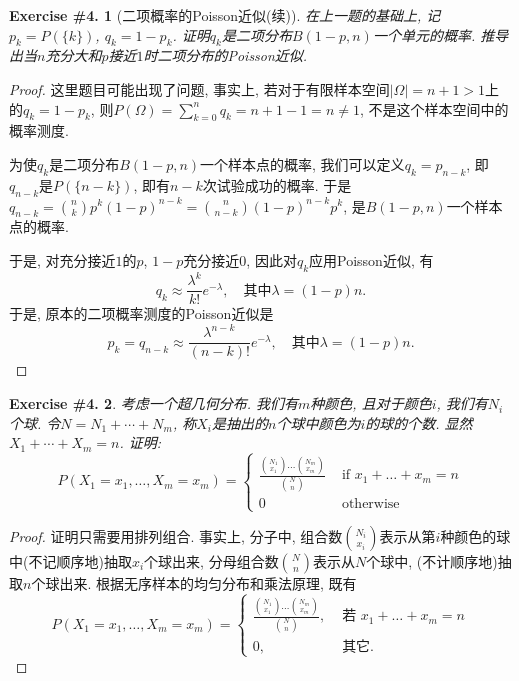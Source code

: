 \documentclass[UTF8, a4paper]{article}
\newtheorem{exercise}{Exercise \#4.}
\begin{document}
\begin{framed}
\begin{exercise}[二项概率的Poisson近似(续)]
    在上一题的基础上, 记\(p_k = P(\{k\})\), \(q_k = 1-p_k\). 证明\(q_k\)是二项分布\(B(1-p, n)\)一个单元的概率.
    推导出当\(n\)充分大和\(p\)接近\(1\)时二项分布的Poisson近似.
\end{exercise}
\end{framed}

\begin{proof}
这里题目可能出现了问题, 事实上, 若对于有限样本空间\(|\Omega| = n + 1> 1\)上的\(q_k = 1 - p_k\), 则\(P(\Omega) = \sum_{k=0}^{n}q_k = n+1-1 = n \neq 1\), 不是这个样本空间中的概率测度.

为使\(q_k\)是二项分布\(B(1-p, n)\)一个样本点的概率, 我们可以定义\(q_k =p_{n-k}\), 即\(q_{n - k}\)是\(P(\{n-k\})\), 即有\(n-k\)次试验成功的概率. 于是\(q_{n - k} = \binom{n}{k}p^k(1-p)^{n-k} = \binom{n}{n-k}(1-p)^{n-k}p^{k}\), 是\(B(1-p, n)\)一个样本点的概率.

于是, 对充分接近\(1\)的\(p\), \(1-p\)充分接近\(0\), 因此对\(q_k\)应用Poisson近似, 有
$$
q_k \approx \frac{\lambda^k}{k!}e^{-\lambda}, \quad \text{其中} \lambda = (1-p)n.
$$
于是, 原本的二项概率测度的Poisson近似是
$$
p_k = q_{n-k} \approx \frac{\lambda^{n-k}}{(n-k)!}e^{-\lambda}, \quad \text{其中} \lambda = (1-p)n.
$$


\end{proof}

\begin{framed}
\begin{exercise}
    考虑一个超几何分布. 我们有\(m\)种颜色, 且对于颜色\(i\), 我们有\(N_i\)个球.
    令\(N = N_1 +\cdots + N_m\), 称\(X_i\)是抽出的\(n\)个球中颜色为\(i\)的球的个数. 显然\(X_1 + \cdots + X_m = n\). 证明:
$$
P\left(X_1=x_1, \ldots, X_m=x_m\right)= \begin{cases}\frac{\binom{N_1}{x_1} \ldots\binom{N_m}{x_m}}{\binom{N}{n}} & \text { if } x_1+\ldots+x_m=n \\ 0 & \text { otherwise }\end{cases}
$$
\end{exercise}
\end{framed}



\begin{proof}
证明只需要用排列组合. 事实上, 
分子中, 组合数\(\binom{N_i}{x_i}\)表示从第\(i\)种颜色的球中(不记顺序地)抽取\(x_i\)个球出来, 
分母组合数\(\binom{N}{n}\)表示从\(N\)个球中, (不计顺序地)抽取\(n\)个球出来.
根据无序样本的均匀分布和乘法原理, 既有
$$
P\left(X_1=x_1, \ldots, X_m=x_m\right)= \begin{cases}\frac{\binom{N_1}{x_1} \ldots\binom{N_m}{x_m}}{\binom{N}{n}}, & \text { 若 } x_1+\ldots+x_m=n \\ 0, & \text { 其它. }\end{cases}
$$
\end{proof}
\end{document}
